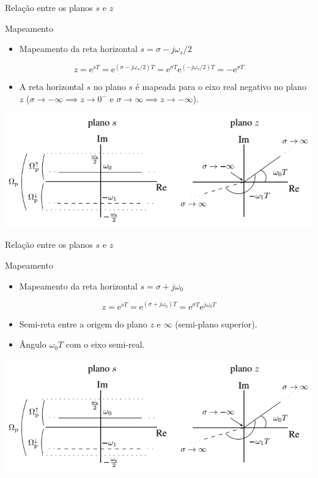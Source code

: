 \begin{frame}{Relação entre os planos $s$ e $z$}
\begin{block}{Mapeamento}
\begin{itemize}
	\item Mapeamento da reta horizontal $s = \sigma - j\omega_s/2$
\end{itemize}
$$z = \text{e}^{sT} = \text{e}^{(\sigma - j\omega_s/2)T} = \text{e}^{\sigma T} \text{e}^{(-j\omega_s/2) T} = -\text{e}^{\sigma T}$$
\begin{itemize}
	\item A reta horizontal $s$ no plano $s$ é mapeada para o eixo real negativo no plano $z$ ($\sigma \to -\infty \implies z \to 0^{-}$ e $\sigma \to \infty \implies z \to -\infty$).
\end{itemize}
\end{block}
\centerline{\includegraphics[width=0.9\linewidth]{Figuras/Ch05/fig2.PNG}}
\end{frame}

\begin{frame}{Relação entre os planos $s$ e $z$}
\begin{block}{Mapeamento}
\begin{itemize}
	\item Mapeamento da reta horizontal $s = \sigma + j\omega_0$
\end{itemize}
$$z = \text{e}^{sT} = \text{e}^{(\sigma + j\omega_0)T} = \text{e}^{\sigma T} \text{e}^{j\omega_0 T}$$
\begin{itemize}
	\item Semi-reta entre a origem do plano $z$ e $\infty$ (semi-plano superior).
	\item Ângulo $\omega_0 T$ com o eixo semi-real. 
\end{itemize}
\end{block}
\centerline{\includegraphics[width=0.9\linewidth]{Figuras/Ch05/fig2.PNG}}
\end{frame}

